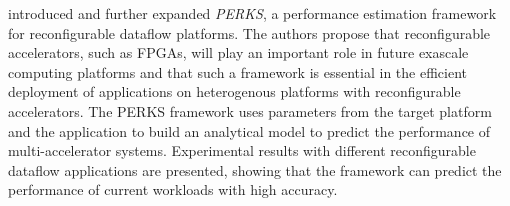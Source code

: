 \citet{Yasudo2018PerformancePlatforms, Yasudo2021AnalyticalPlatforms} %
introduced and further expanded %
\emph{PERKS}, a performance estimation framework for reconfigurable dataflow platforms. The authors propose %
that reconfigurable accelerators, such as FPGAs, will play an important role in future exascale computing platforms and that such a framework is essential in the efficient deployment of applications on heterogenous platforms with reconfigurable accelerators. The PERKS framework uses parameters from the target platform and the application to build an analytical model to predict the performance of multi-accelerator systems. Experimental results with different reconfigurable dataflow applications are presented, showing that the framework can predict the performance of current workloads with high accuracy.




